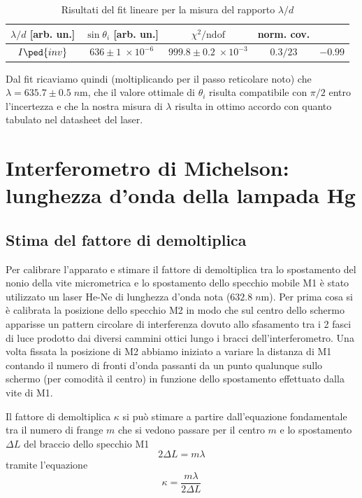 \documentclass[10pt, a4paper, italian]{article}
\begin{document}
\begin{table}
\centering
\begin{tabular}{ccccc}
\toprule
$\lambda/d$ [arb. un.] & $\sin{\theta_i}$ [arb. un.] &
$\chi^2/\text{ndof}$ & norm. cov. \\
\midrule
$I\ped{inv}$ & $636 \pm 1 \; \times 10^{-6}$
& $999.8 \pm 0.2 \; \times 10^{-3}$ & $0.3/23$ & $-0.99$ \\
\bottomrule
\end{tabular}
\caption{Risultati del fit lineare per la misura del rapporto $\lambda/d$
\label{tab: linfit}}
\end{table}

Dal fit ricaviamo quindi (moltiplicando per il passo reticolare noto) che
$\lambda = 635.7 \pm 0.5 \; \si{n\m}$, che il valore ottimale di $\theta_i$
risulta compatibile con $\pi/2$ entro l'incertezza e che la nostra misura di
$\lambda$ risulta in ottimo accordo con quanto tabulato nel datasheet del
laser.

\section{Interferometro di Michelson: lunghezza d'onda della lampada Hg}
\subsection{Stima del fattore di demoltiplica}
Per calibrare l'apparato e stimare il fattore di demoltiplica tra lo
spostamento del nonio della vite micrometrica e lo spostamento dello
specchio mobile M1 è stato utilizzato un laser He-Ne di lunghezza d'onda nota
($632.8 \; \si{n\m}$).
Per prima cosa si è calibrata la posizione dello specchio M2 in modo che sul
centro dello schermo apparisse un pattern circolare di interferenza dovuto
allo sfasamento tra i 2 fasci di luce prodotto dai diversi cammini ottici
lungo i bracci dell'interferometro.
Una volta fissata la posizione di M2 abbiamo iniziato a variare la distanza
di M1 contando il numero di fronti d'onda passanti da un punto qualunque
sullo schermo (per comodità il centro) in funzione dello spostamento
effettuato dalla vite di M1. 

Il fattore di demoltiplica $\kappa$ si può stimare a partire dall'equazione
fondamentale tra il numero di frange $m$ che si vedono passare per il centro
$m$ e lo spostamento $\Delta L$ del braccio dello specchio M1
\begin{equation}\label{eq: fond}
2 \Delta L = m \lambda
\end{equation}
tramite l'equazione
\begin{equation}\label{eq: dem}
\kappa = \frac{m \lambda}{2 \Delta L}
\end{equation}
\end{document}
